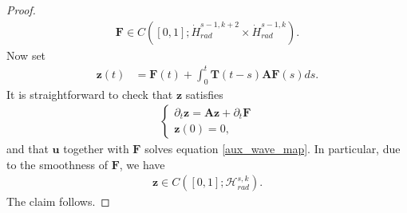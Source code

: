\documentclass[12pt,reqno]{amsart}
\theoremstyle{plain}
\theoremstyle{remark}
\theoremstyle{plain}
\theoremstyle{definition}
\numberwithin{equation}{section}
\numberwithin{equation}{section}
\newcommand{\HH}{\mathcal{H}}
\begin{document}
\begin{proof}
		\begin{align*}
			\mathbf{F}\in C([0,1];\dot{H}^{s-1,k+2}_{rad}\times \dot{H}^{s-1,k}_{rad}).
		\end{align*}
		Now set 
		\begin{align*}
			\mathbf{z}(t)&=\mathbf{F}(t)+\int_0^t \mathbf{T}(t-s)\mathbf{A} \mathbf{F}(s) ds.
		\end{align*}
		It is straightforward to check that $\mathbf{z}$ satisfies
		\begin{align*}
			\begin{cases}
				\partial_t \mathbf{z}=\mathbf{A} \mathbf{z}+\partial_t \mathbf{F}\\
				\mathbf{z}(0)=0,
			\end{cases}     
		\end{align*}
		and that $\mathbf{u}$ together with $\mathbf{F}$ solves equation \eqref{aux_wave_map}. In particular, due to the smoothness of $\mathbf{F}$, we have \begin{align*}
		    \mathbf{z}\in C([0,1];\HH_{rad}^{s,k}).
		\end{align*}The claim follows.
	\end{proof}
\end{document}
